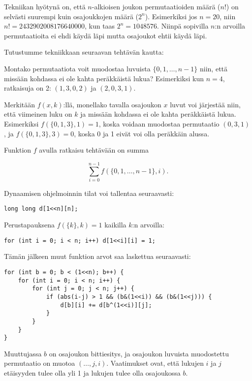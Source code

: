 Tekniikan hyötynä on,
että $n$-alkioisen joukon permutaatioiden määrä ($n!$)
on selvästi suurempi kuin osajoukkojen määrä ($2^n$).
Esimerkiksi jos $n=20$, niin $n!=2432902008176640000$,
kun taas $2^n=1048576$.
Niinpä sopivilla $n$:n arvoilla permutaatioita ei ehdi
käydä läpi mutta osajoukot ehtii käydä läpi.

Tutustumme tekniikkaan seuraavan tehtävän kautta:

\begin{task}
Montako permutaatiota voit muodostaa
luvuista $\{ 0,1,\ldots,n-1 \}$ niin,
että missään kohdassa ei ole kahta peräkkäistä lukua?
Esimerkiksi kun $n=4$, ratkaisuja on 2: $(1,3,0,2)$
ja $(2,0,3,1)$.
\end{task}

Merkitään $f(x,k)$:llä,
monellako tavalla osajoukon
$x$ luvut voi järjestää niin,
että viimeinen luku on $k$ ja missään kohdassa
ei ole kahta peräkkäistä lukua.
Esimerkiksi $f(\{0,1,3\},1)=1$,
koska voidaan muodostaa permutaatio $(0,3,1)$,
ja $f(\{0,1,3\},3)=0$, koska 0 ja 1 eivät
voi olla peräkkäin alussa.

Funktion $f$ avulla ratkaisu tehtävään
on summa

\[ \sum_{i=0}^{n-1} f(\{0,1,\ldots,n-1\},i). \]

\noindent
Dynaamisen ohjelmoinnin tilat voi
tallentaa seuraavasti:

\begin{lstlisting}
long long d[1<<n][n];
\end{lstlisting}

\noindent
Perustapauksena $f(\{k\},k)=1$ kaikilla $k$:n arvoilla:

\begin{lstlisting}
for (int i = 0; i < n; i++) d[1<<i][i] = 1;
\end{lstlisting}

\noindent
Tämän jälkeen muut funktion arvot
saa laskettua seuraavasti:

\begin{lstlisting}
for (int b = 0; b < (1<<n); b++) {
    for (int i = 0; i < n; i++) {
        for (int j = 0; j < n; j++) {
            if (abs(i-j) > 1 && (b&(1<<i)) && (b&(1<<j))) {
                d[b][i] += d[b^(1<<i)][j];
            }
        }
    }
}
\end{lstlisting}

\noindent
Muuttujassa $b$ on osajoukon bittiesitys,
ja osajoukon luvuista muodostettu
permutaatio on muotoa $(\ldots,j,i)$.
Vaatimukset ovat, että lukujen $i$ ja $j$
etäisyyden tulee olla yli 1
ja lukujen tulee olla osajoukossa $b$.

